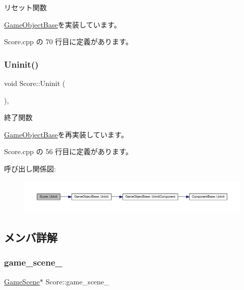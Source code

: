 リセット関数 



\mbox{\hyperlink{class_game_object_base_a85c59554f734bcb09f1a1e18d9517dce}{Game\+Object\+Base}}を実装しています。



 Score.\+cpp の 70 行目に定義があります。

\mbox{\label{class_score_a605e163dc59ccc4d19a3cb6b5db813b8}} 
\subsubsection{\texorpdfstring{Uninit()}{Uninit()}}
{\footnotesize\ttfamily void Score\+::\+Uninit (\begin{DoxyParamCaption}{ }\end{DoxyParamCaption})\hspace{0.3cm}{\ttfamily [override]}, {\ttfamily [virtual]}}



終了関数 



\mbox{\hyperlink{class_game_object_base_a97e1bc277d7b1c0156d4735de29a022c}{Game\+Object\+Base}}を再実装しています。



 Score.\+cpp の 56 行目に定義があります。

呼び出し関係図\+:\nopagebreak
\begin{figure}[H]
\begin{center}
\leavevmode
\includegraphics[width=350pt]{class_score_a605e163dc59ccc4d19a3cb6b5db813b8_cgraph}
\end{center}
\end{figure}


\subsection{メンバ詳解}
\mbox{\label{class_score_ada5a957b01fbed0c1bb52cea4e1bcbc4}} 
\subsubsection{\texorpdfstring{game\+\_\+scene\+\_\+}{game\_scene\_}}
{\footnotesize\ttfamily \mbox{\hyperlink{class_game_scene}{Game\+Scene}}$\ast$ Score\+::game\+\_\+scene\+\_\+}



